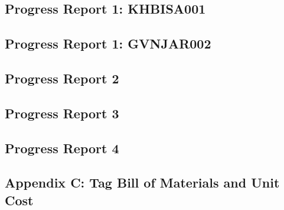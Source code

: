 \newpage
\vspace*{\fill}
\begin{center}
\subsection*{Progress Report 1: KHBISA001}
\end{center}
\vspace*{\fill}


\newpage
\vspace*{\fill}
\begin{center}
\subsection*{Progress Report 1: GVNJAR002}
\end{center}
\vspace*{\fill}
%

\newpage
\vspace*{\fill}
\begin{center}
\subsection*{Progress Report 2}
\end{center}
\vspace*{\fill}


\newpage
\vspace*{\fill}
\begin{center}
\subsection*{Progress Report 3}
\end{center}
\vspace*{\fill}


\newpage
\vspace*{\fill}
\begin{center}
\subsection*{Progress Report 4}
\end{center}
\vspace*{\fill}


\newpage
\vspace*{\fill}
\begin{center}
\subsection*{Appendix C: Tag Bill of Materials and Unit Cost}
\end{center}
\vspace*{\fill}

